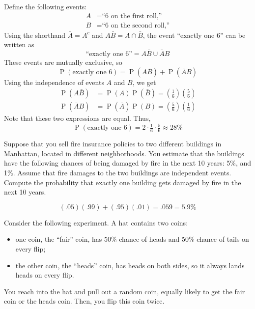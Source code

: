 \documentclass[answers,11pt]{exam}
\DeclareMathOperator*{\Prob}{P}
\renewcommand{\Pr}{\Prob}
\begin{document}
\begin{questions}
\begin{solution}
Define the following events:
\begin{align*}
  A &= \text{``6 on the first roll,''} \\
  B &= \text{``6 on the second roll,''}
\end{align*}
Using the shorthand $\bar A = A^c$ and $A\bar B = A \cap \bar B$, the event
``exactly one 6'' can be written as
\[
  \text{``exactly one 6''}
  = A \bar B \cup \bar A B
\]
These events are mutually exclusive, so
\[
  \Pr(\text{exactly one 6})
  = \Pr(A \bar B) 
  + \Pr(\bar A B)
\]
Using the independence of events $A$ and $B$, we get
\begin{align*}
  \Pr(A \bar B)  &= \Pr(A) \Pr(\bar B) = (\tfrac{1}{6}) (\tfrac{5}{6}) \\
  \Pr(\bar A B)  &= \Pr(\bar A) \Pr(B) = (\tfrac{5}{6}) (\tfrac{1}{6})
\end{align*}
Note that these two expressions are equal.  Thus,
\[
  \Pr(\text{exactly one 6})
  = 2 \cdot \tfrac{1}{6} \cdot \tfrac{5}{6}
  \approx 28\%
\]


\end{solution}

%
%

\question Suppose that you sell fire insurance policies to two different
buildings in Manhattan, located in different neighborhoods.  You estimate that
the buildings have the following chances of being damaged by fire in the next
10 years: 5\%, and 1\%.  Assume that fire damages to the two buildings
are independent events.  Compute the probability that exactly one building
gets damaged by fire in the next 10 years.

\begin{solution}
  \[
    (.05) (.99) + (.95) (.01) = .059 = 5.9\%
  \]
\end{solution}

\newpage

\question Consider the following experiment. A hat contains two coins:
\begin{itemize}
  \item one coin, the ``fair'' coin, has 50\% chance of heads and 50\% chance of tails on
every flip;
  \item the other coin, the ``heads'' coin, has heads on both sides, so it
always lands heads on every flip.
\end{itemize}
You reach into the hat and pull out a
random coin, equally likely to get the fair coin or the heads coin. Then, you
flip this coin twice.


\end{questions}
\end{document}
